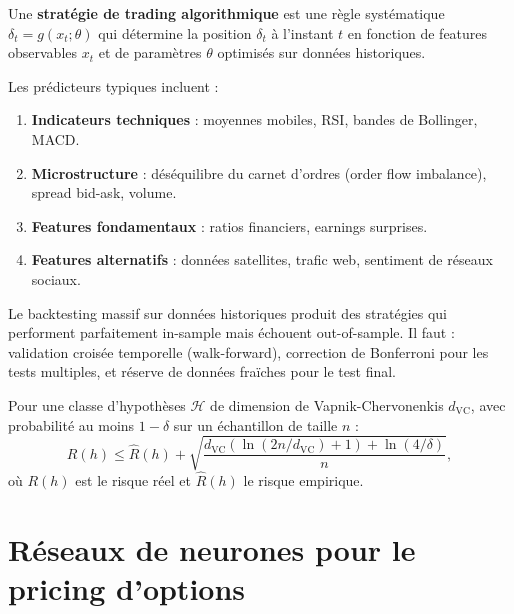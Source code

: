 \begin{definition}
Une \textbf{strat\'egie de trading algorithmique} est une r\`egle syst\'ematique
$\delta_t = g(x_t; \theta)$ qui d\'etermine la position $\delta_t$ \`a
l'instant $t$ en fonction de features observables $x_t$ et de param\`etres
$\theta$ optimis\'es sur donn\'ees historiques.
\end{definition}

\begin{proposition}
Les pr\'edicteurs typiques incluent :
\begin{enumerate}
    \item \textbf{Indicateurs techniques} : moyennes mobiles, RSI, bandes de
    Bollinger, MACD.
    \item \textbf{Microstructure} : d\'es\'equilibre du carnet d'ordres (order
    flow imbalance), spread bid-ask, volume.
    \item \textbf{Features fondamentaux} : ratios financiers, earnings
    surprises.
    \item \textbf{Features alternatifs} : donn\'ees satellites, trafic web,
    sentiment de r\'eseaux sociaux.
\end{enumerate}
\end{proposition}

\begin{attention}[title=\textbf{Surapprentissage et data snooping}]
Le backtesting massif sur donn\'ees historiques produit des strat\'egies qui
performent parfaitement in-sample mais \'echouent out-of-sample. Il faut :
validation crois\'ee temporelle (walk-forward), correction de Bonferroni pour
les tests multiples, et r\'eserve de donn\'ees fraïches pour le test final.
\end{attention}

\begin{theoreme}
Pour une classe d'hypoth\`eses $\mathcal{H}$ de dimension de Vapnik-Chervonenkis
$d_{\mathrm{VC}}$, avec probabilit\'e au moins $1 - \delta$ sur un \'echantillon
de taille $n$ :
\[
    R(h) \leq \hat{R}(h) + \sqrt{\frac{d_{\mathrm{VC}}(\ln(2n/d_{\mathrm{VC}}) + 1) + \ln(4/\delta)}{n}},
\]
o\`u $R(h)$ est le risque r\'eel et $\hat{R}(h)$ le risque empirique.
\end{theoreme}

\section{R\'eseaux de neurones pour le pricing d'options}

